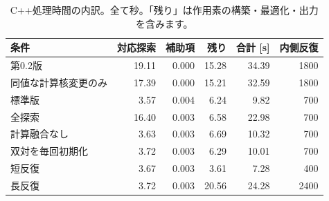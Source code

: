 \begin{table}[H]\centering
\small
\setlength{\tabcolsep}{4pt}
\caption{C++処理時間の内訳。全て秒。「残り」は作用素の構築・最適化・出力を含みます。}
\begin{tabular}{lrrrrr}
\toprule
条件 & 対応探索 & 補助項 & 残り & 合計 [s] & 内側反復\\\midrule
第0.2版 & 19.11 & 0.000 & 15.28 & 34.39 & 1800\\
同値な計算核変更のみ & 17.39 & 0.000 & 15.21 & 32.59 & 1800\\
標準版 & 3.57 & 0.004 & 6.24 & 9.82 & 700\\
全探索 & 16.40 & 0.003 & 6.58 & 22.98 & 700\\
計算融合なし & 3.63 & 0.003 & 6.69 & 10.32 & 700\\
双対を毎回初期化 & 3.72 & 0.003 & 6.29 & 10.01 & 700\\
短反復 & 3.67 & 0.003 & 3.61 & 7.28 & 400\\
長反復 & 3.72 & 0.003 & 20.56 & 24.28 & 2400\\
\bottomrule
\end{tabular}
\end{table}
